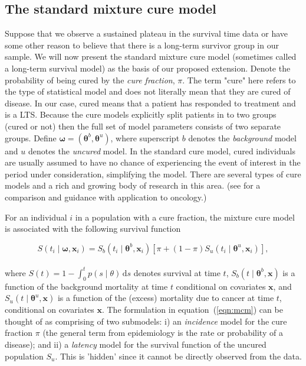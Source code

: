 \documentclass[AMA,STIX1COL]{WileyNJD-v2}
\begin{document}
\subsection{The standard mixture cure model} \label{section:basic_model}
Suppose that we observe a sustained plateau in the survival time data or have some other reason to believe that there is a long-term survivor group in our sample. We will now present the standard mixture cure model (sometimes called a long-term survival model) as the basis of our proposed extension.
Denote the probability of being cured by the {\it cure fraction}, $\pi$.
The term "cure" here refers to the type of statistical model and does not literally mean that they are cured of disease. In our case, cured means that a patient has responded to treatment and is a LTS.
Because the cure models explicitly split patients in to two groups (cured or not) then the full set of model parameters consists of two separate groups.
Define $\bm\omega = (\bm\theta^b, \bm\theta^u)$, where superscript $b$ denotes the \textit{background} model and $u$ denotes the \textit{uncured} model.
In the standard cure model, cured individuals are usually assumed to have no chance of experiencing the event of interest in the period under consideration, simplifying the model.
There are several types of cure models and a rich and growing body of research in this area.
(see \citep{Yu2013} for a comparison and guidance with application to oncology.)

For an individual $i$ in a population with a cure fraction, the mixture cure model is associated with the following survival function

\begin{equation}
\label{eqn:mcm}
S(t_{i} \mid \bm\omega, \bm{x}_i) = S_b(t_{i} \mid \bm\theta^b, \bm{x}_{i}) \left[\pi + (1 - \pi) S_u(t_{i} \mid \bm\theta^u, \bm{x}_{i}) \right],
\end{equation}
\\
\noindent
where $S(t) = 1 \!-\! \int_0^t p(s \mid \theta)\, \text{d}s$ denotes survival at time $t$,
$S_b(t \mid \bm\theta^b, \bm{x})$ is a function of the background mortality at time $t$ conditional on covariates $\bm{x}$,
and $S_u(t \mid \bm\theta^u, \bm{x})$ is a function of the (excess) mortality due to cancer at time $t$, conditional on covariates $\bm{x}$.
The formulation in equation~(\ref{eqn:mcm}) can be thought of as comprising of two submodels: i) an \textit{incidence} model for the cure fraction $\pi$ (the general term from epidemiology is the rate or probability of a disease); and ii) a \textit{latency} model for the survival function of the uncured population $S_u$. This is 'hidden' since it cannot be directly observed from the data.
\end{document}
